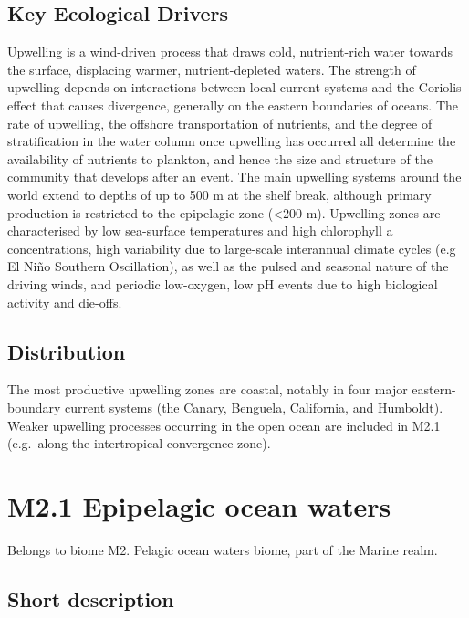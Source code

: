\documentclass[
  letterpaper,
  DIV=11,
  numbers=noendperiod]{scrartcl}
\begin{document}
\subsection{Key Ecological Drivers}\label{key-ecological-drivers-34}

Upwelling is a wind-driven process that draws cold, nutrient-rich water
towards the surface, displacing warmer, nutrient-depleted waters. The
strength of upwelling depends on interactions between local current
systems and the Coriolis effect that causes divergence, generally on the
eastern boundaries of oceans. The rate of upwelling, the offshore
transportation of nutrients, and the degree of stratification in the
water column once upwelling has occurred all determine the availability
of nutrients to plankton, and hence the size and structure of the
community that develops after an event. The main upwelling systems
around the world extend to depths of up to 500 m at the shelf break,
although primary production is restricted to the epipelagic zone
(\textless200 m). Upwelling zones are characterised by low sea-surface
temperatures and high chlorophyll a concentrations, high variability due
to large-scale interannual climate cycles (e.g El Niño Southern
Oscillation), as well as the pulsed and seasonal nature of the driving
winds, and periodic low-oxygen, low pH events due to high biological
activity and die-offs.

\subsection{Distribution}\label{distribution-34}

The most productive upwelling zones are coastal, notably in four major
eastern-boundary current systems (the Canary, Benguela, California, and
Humboldt). Weaker upwelling processes occurring in the open ocean are
included in M2.1 (e.g.~along the intertropical convergence zone).

\section{M2.1 Epipelagic ocean
waters}\label{m2.1-epipelagic-ocean-waters}

Belongs to biome M2. Pelagic ocean waters biome, part of the Marine
realm.

\subsection{Short description}\label{short-description-35}
\end{document}

